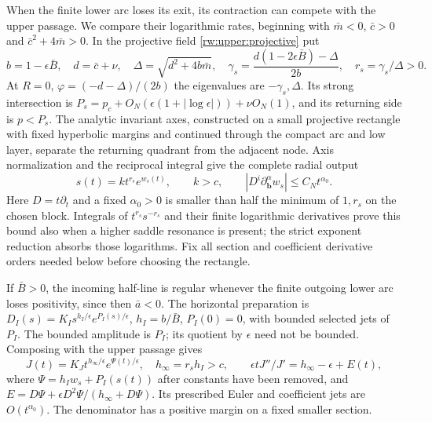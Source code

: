 When the finite lower arc loses its exit, its contraction can compete
with the upper passage. We compare their logarithmic rates, beginning
with $\bar m<0$, $\bar c>0$ and $\bar c^2+4\bar m>0$.
In the projective field
\eqref{rw:upper:projective} put
\[
 b=1-\epsilon\bar B,\quad d=\bar c+\nu,\quad
 \Delta=\sqrt{d^2+4b\bar m},\quad
 \gamma_s=\frac{d(1-2\epsilon\bar B)-\Delta}{2b},\quad
 r_s=\gamma_s/\Delta>0.
\]
At $R=0$, $\varphi=(-d-\Delta)/(2b)$ the eigenvalues are
$-\gamma_s,\Delta$. Its strong intersection is
$P_s=p_c+O_N(\epsilon(1+|\log\epsilon|))+\nu O_N(1)$,
and its returning side is $p<P_s$.
The analytic invariant axes, constructed on a small projective
rectangle with fixed hyperbolic margins and continued through the
compact arc and low layer, separate the returning quadrant from the
adjacent node. Axis normalization and the reciprocal integral give
the complete radial output
\[
 s(t)=k t^{r_s}e^{w_s(t)},\qquad k>c,\qquad
 |D^i\partial_{\mathbf b}^{\alpha}w_s|\le C_Nt^{\alpha_0}.
\]
Here $D=t\partial_t$ and a fixed $\alpha_0>0$ is smaller than
half the minimum of $1,r_s$ on the chosen block. Integrals of
$t^{r_s}s^{-r_s}$ and their finite logarithmic derivatives prove
this bound also when a higher saddle resonance is present; the
strict exponent reduction absorbs those logarithms. Fix all section
and coefficient derivative orders needed below before
choosing the rectangle.

If $\bar B>0$, the incoming half-line is regular whenever the
finite outgoing lower arc loses positivity, since then $\bar a<0$.
The horizontal preparation is
$D_I(s)=K_Is^{h_I/\epsilon}e^{P_I(s)/\epsilon}$,
$h_I=b/\bar B$, $P_I(0)=0$, with bounded selected jets of $P_I$.
The bounded amplitude is $P_I$; its quotient by $\epsilon$ need not
be bounded. Composing with the upper passage gives
\begin{equation}\label{rw:infinity:strict-rate}
 J(t)=K_Jt^{h_\infty/\epsilon}e^{\Psi(t)/\epsilon},\quad
 h_\infty=r_sh_I>c,\qquad
 \epsilon tJ''/J'=h_\infty-\epsilon+E(t),
\end{equation}
where $\Psi=h_Iw_s+P_I(s(t))$ after constants have been removed,
and
$E=D\Psi+\epsilon D^2\Psi/(h_\infty+D\Psi)$.
Its prescribed Euler and coefficient jets are $O(t^{\alpha_0})$.
The denominator has a positive margin on a fixed smaller section.

